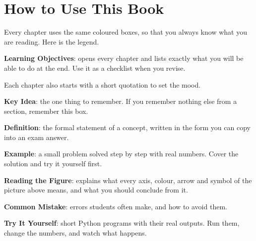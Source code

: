 \chapter*{How to Use This Book}

Every chapter uses the same coloured boxes, so that you always know what you are reading. Here is the legend.

\begin{objectives}
\textbf{Learning Objectives}: opens every chapter and lists exactly what you will be able to do at the end. Use it as a checklist when you revise.
\end{objectives}

\begin{pullquote}
Each chapter also starts with a short quotation to set the mood.
\end{pullquote}

\begin{keyidea}
\textbf{Key Idea}: the one thing to remember. If you remember nothing else from a section, remember this box.
\end{keyidea}

\begin{definition}[: Term]
\textbf{Definition}: the formal statement of a concept, written in the form you can copy into an exam answer.
\end{definition}

\begin{example}
\textbf{Example}: a small problem solved step by step with real numbers. Cover the solution and try it yourself first.
\end{example}

\begin{explain}
\textbf{Reading the Figure}: explains what every axis, colour, arrow and symbol of the picture above means, and what you should conclude from it.
\end{explain}

\begin{warning}
\textbf{Common Mistake}: errors students often make, and how to avoid them.
\end{warning}

\begin{tryit}
\textbf{Try It Yourself}: short Python programs with their real outputs. Run them, change the numbers, and watch what happens.
\end{tryit}

